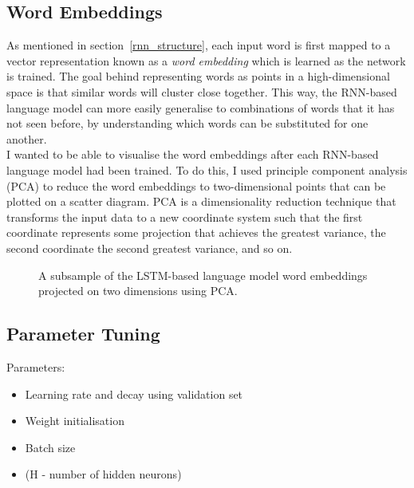 \documentclass[a4paper, 12pt]{report}
\newcommand{\tit}[1]{\textit{#1}}
\begin{document}
\subsection{Word Embeddings} \label{embeddings}

As mentioned in section~\ref{rnn_structure}, each input word is first mapped to a vector representation known as a \tit{word embedding} which is learned as the network is trained. The goal behind representing words as points in a high-dimensional space is that similar words will cluster close together. This way, the RNN-based language model can more easily generalise to combinations of words that it has not seen before, by understanding which words can be substituted for one another. \\

I wanted to be able to visualise the word embeddings after each RNN-based language model had been trained. To do this, I used principle component analysis (PCA) to reduce the word embeddings to two-dimensional points that can be plotted on a scatter diagram. PCA is a dimensionality reduction technique that transforms the input data to a new coordinate system such that the first coordinate represents some projection that achieves the greatest variance, the second coordinate the second greatest variance, and so on.

\begin{figure}[h]
\captionsetup{justification=centering}
\centering
{}
\caption{A subsample of the LSTM-based language model word embeddings projected on two dimensions using PCA.}
\label{fig:pca_embeddings_all}
\end{figure}

\subsection{Parameter Tuning} \label{tuning}

Parameters:
\begin{itemize}
\item
	Learning rate and decay using validation set
\item
	Weight initialisation
\item
	Batch size
\item
	(H - number of hidden neurons)
\end{itemize}
\end{document}
